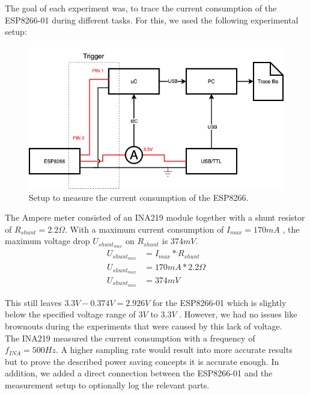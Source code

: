 The goal of each experiment was, to trace the current consumption of the ESP8266-01 during different tasks.
For this, we used the following experimental setup:

\begin{figure}[H]
    \centering
    \includegraphics[width = \linewidth]{fig/experimental_setup.png}
    \caption{Setup to measure the current consumption of the ESP8266.}
    \label{fig:experiment_setup}
\end{figure}

The Ampere meter consisted of an INA219 module together with a shunt resistor of $R_{shunt} = 2.2 \Omega$.
With a maximum current consumption of $I_{max}=170 mA$ \cite{espressif_inc_esp8266_2016}, the maximum voltage drop $U_{shunt_{max}}$ on $R_{shunt}$ is $374mV$.
\begin{align*}
    U_{shunt_{max}} &= I_{max} * R_{shunt}\\
    U_{shunt_{max}} &= 170mA * 2.2 \Omega\\
    U_{shunt_{max}} &= 374mV
\end{align*}

This still leaves $3.3V - 0.374V = 2.926V$ for the ESP8266-01 which is slightly below the specified voltage range of $3V$ to $3.3V$ \cite{espressif_inc_esp8266_2016}.
However, we had no issues like brownouts during the experiments that were caused by this lack of voltage.\\
The INA219 measured the current consumption with a frequency of $f_{INA} = 500Hz$.
A higher sampling rate would result into more accurate results but to prove the
described power saving concepts it is accurate enough.
In addition, we added a direct connection between the ESP8266-01 and the measurement setup to optionally log the relevant parts.

